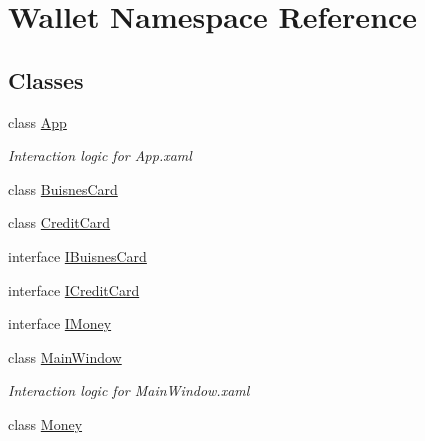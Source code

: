 \hypertarget{namespace_wallet}{}\section{Wallet Namespace Reference}
\label{namespace_wallet}
\subsection*{Classes}
\begin{DoxyCompactItemize}
\item 
class \hyperlink{class_wallet_1_1_app}{App}
\begin{DoxyCompactList}\small\item\em Interaction logic for App.\+xaml \end{DoxyCompactList}\item 
class \hyperlink{class_wallet_1_1_buisnes_card}{Buisnes\+Card}
\item 
class \hyperlink{class_wallet_1_1_credit_card}{Credit\+Card}
\item 
interface \hyperlink{interface_wallet_1_1_i_buisnes_card}{I\+Buisnes\+Card}
\item 
interface \hyperlink{interface_wallet_1_1_i_credit_card}{I\+Credit\+Card}
\item 
interface \hyperlink{interface_wallet_1_1_i_money}{I\+Money}
\item 
class \hyperlink{class_wallet_1_1_main_window}{Main\+Window}
\begin{DoxyCompactList}\small\item\em Interaction logic for Main\+Window.\+xaml \end{DoxyCompactList}\item 
class \hyperlink{class_wallet_1_1_money}{Money}
\end{DoxyCompactItemize}
